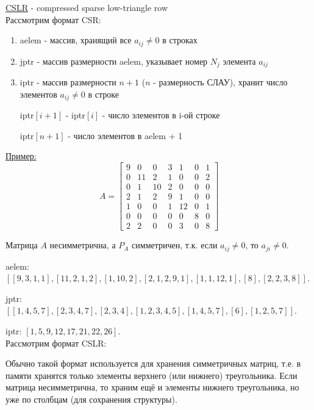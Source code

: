\documentclass{bmstu}
\begin{document}
\underline{CSLR} - compressed sparse low-triangle row \\

Рассмотрим формат CSR:
\begin{enumerate}
	\item aelem - массив, хранящий все $a_{ij}\neq 0$ в строках
	\item jptr - массив размерности aelem, указывает номер $N_j$ элемента $a_{ij}$
	\item iptr - массив размерности $n+1$ ($n$ - размерность СЛАУ), хранит число элементов $a_{ij}\neq 0$ в строке
	
	iptr$[i+1]$ - iptr$[i]$ - число элементов в i-ой строке
	
	iptr$[n+1]$ - число элементов в aelem + 1
\end{enumerate}

\underline{Пример:}
\[
A=
\begin{bmatrix}
	9&0&0&3&1&0&1 \\
	0&11&2&1&0&0&2 \\
	0&1&10&2&0&0&0 \\
	2&1&2&9&1&0&0 \\
	1&0&0&1&12&0&1 \\
	0&0&0&0&0&8&0 \\
	2&2&0&0&3&0&8 
\end{bmatrix}
\]

Матрица $A$ несимметрична, а $P_A$ симметричен, т.к. если $a_{ij}\neq 0$, то $a_{ji}\neq 0$.

aelem: $\left[\left[ 9, 3, 1, 1 \right], \left[11, 2, 1, 2\right], \left[1, 10, 2\right],\left[2, 1, 2 ,9, 1\right],\left[1, 1, 12, 1\right],\left[8\right],\left[2, 2, 3, 8\right] \right]$.

jptr: $\left[\left[1, 4, 5, 7\right], \left[2, 3, 4, 7\right], \left[2, 3, 4\right],\left[1, 2, 3, 4, 5\right],\left[1, 4, 5, 7 \right],\left[6\right],\left[1, 2, 5, 7\right] \right]$.

iptr: $\left[1, 5, 9, 12, 17, 21, 22, 26\right]$. \\

Рассмотрим формат CSLR:

Обычно такой формат используется для хранения симметричных матриц, т.е. в памяти хранятся только элементы верхнего (или нижнего) треугольника.
Если матрица несимметрична, то храним ещё и элементы нижнего треугольника, но уже по столбцам (для сохранения структуры).
\end{document}
